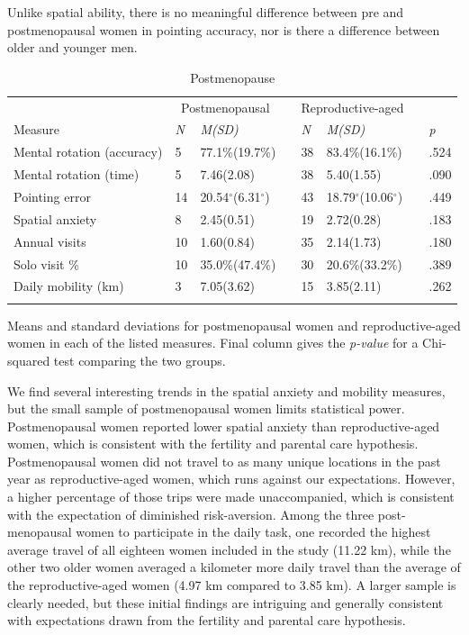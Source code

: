 Unlike spatial ability, there is no meaningful difference between pre and postmenopausal women in pointing accuracy, nor is there a difference between older and younger men.

\begin{table}[h!]
\caption{Postmenopause}
\label{tab:meno}  
\begin{tabular}{llllllll}
\hline\noalign{\smallskip}
& \multicolumn{2}{c}{Postmenopausal} && \multicolumn{2}{c}{Reproductive-aged} && \\
Measure & \emph{N} & \emph{M(SD)} && \emph{N} & \emph{M(SD)} && \emph{p} \\
\noalign{\smallskip}\hline\noalign{\smallskip}
Mental rotation (accuracy) & 5 & 77.1\%(19.7\%) && 38 & 83.4\%(16.1\%) && .524 \\
Mental rotation (time) & 5 & 7.46(2.08) && 38 & 5.40(1.55) && .090 \\
Pointing error & 14 & 20.54$^{\circ}$(6.31$^{\circ}$) && 43 & 18.79$^{\circ}$(10.06$^{\circ}$) && .449 \\
Spatial anxiety & 8 & 2.45(0.51) && 19 & 2.72(0.28) && .183 \\
Annual visits & 10 & 1.60(0.84) && 35 & 2.14(1.73) && .180 \\
Solo visit \% & 10 & 35.0\%(47.4\%) && 30 & 20.6\%(33.2\%) && .389 \\
Daily mobility (km) & 3 & 7.05(3.62) && 15 & 3.85(2.11) && .262 \\
\noalign{\smallskip}\hline
\end{tabular}\par
\bigskip
Means and standard deviations for postmenopausal women and reproductive-aged women in each of the listed measures. Final column gives the \emph{p-value} for a Chi-squared test comparing the two groups. \end{table}	

We find several interesting trends in the spatial anxiety and mobility measures, but the small sample of postmenopausal women limits statistical power.  Postmenopausal women reported lower spatial anxiety than reproductive-aged women, which is consistent with the fertility and parental care hypothesis.  Postmenopausal women did not travel to as many unique locations in the past year as reproductive-aged women, which runs against our expectations.  However, a higher percentage of those trips were made unaccompanied, which is consistent with the expectation of diminished risk-aversion.  Among the three post-menopausal women to participate in the daily task, one recorded the highest average travel of all eighteen women included in the study (11.22 km), while the other two older women averaged a kilometer more daily travel than the average of the reproductive-aged women (4.97 km compared to 3.85 km).  A larger sample is clearly needed, but these initial findings are intriguing and generally consistent with expectations drawn from the fertility and parental care hypothesis.


